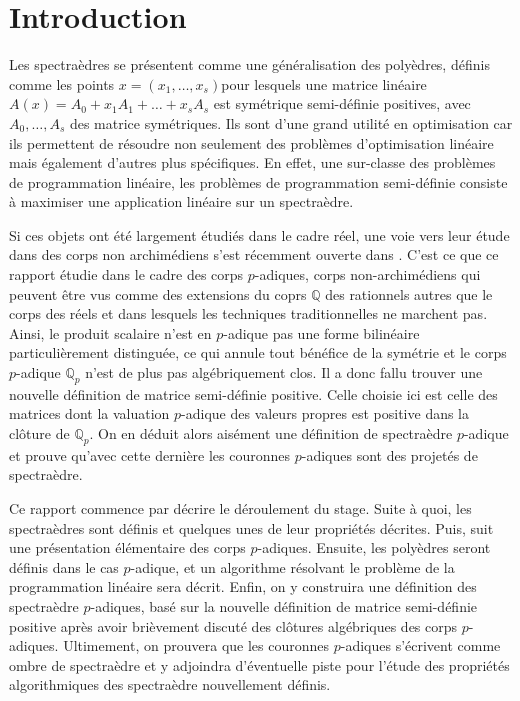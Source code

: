 \section{Introduction} 
Les spectraèdres se présentent comme une généralisation des polyèdres, définis comme les points $x = (x_1,\ldots,x_s)$pour lesquels une matrice linéaire $A(x) = A_0 + x_1A_1+\ldots+x_s A_s$ est symétrique semi-définie positives, avec $A_0,\ldots,A_s$ des matrice symétriques. Ils sont d'une grand utilité en optimisation car ils permettent de résoudre non seulement des problèmes d'optimisation linéaire mais également d'autres plus spécifiques. En effet, une sur-classe des problèmes de programmation linéaire, les problèmes de programmation semi-définie consiste à maximiser une application linéaire sur un spectraèdre.

Si ces objets ont été largement étudiés dans le cadre réel, une voie vers leur étude dans des corps non archimédiens s'est récemment ouverte dans \cite{allamigeon_tropical_2020}. C'est ce que ce rapport étudie dans le cadre des corps $p$-adiques, corps non-archimédiens qui peuvent être vus comme des extensions du coprs $\mathbb{Q}$ des rationnels autres que le corps des réels et dans lesquels les techniques traditionnelles ne marchent pas. Ainsi, le produit scalaire n'est en $p$-adique pas une forme bilinéaire particulièrement distinguée, ce qui annule tout bénéfice de la symétrie et le corps $p$-adique $\mathbb{Q}_{p}$ n'est de plus pas algébriquement clos. Il a donc fallu trouver une nouvelle définition de matrice semi-définie positive. Celle choisie ici est celle des matrices dont la valuation $p$-adique des valeurs propres est positive dans la clôture de $\mathbb{Q}_{p}$. On en déduit alors aisément une définition de spectraèdre $p$-adique et prouve qu'avec cette dernière les couronnes $p$-adiques sont des projetés de spectraèdre.


Ce rapport commence par décrire le déroulement du stage. Suite à quoi, les spectraèdres sont définis et quelques unes de leur propriétés décrites. Puis, suit une présentation élémentaire des corps $p$-adiques. Ensuite, les polyèdres seront définis dans le cas $p$-adique, et un algorithme résolvant le problème de la programmation linéaire sera décrit. Enfin, on y construira une définition des spectraèdre $p$-adiques, basé sur la nouvelle définition de matrice semi-définie positive après avoir brièvement discuté des clôtures algébriques des corps $p$-adiques. Ultimement, on prouvera que les couronnes $p$-adiques s'écrivent comme ombre de spectraèdre et y adjoindra d'éventuelle piste pour l'étude des propriétés algorithmiques des spectraèdre nouvellement définis.

